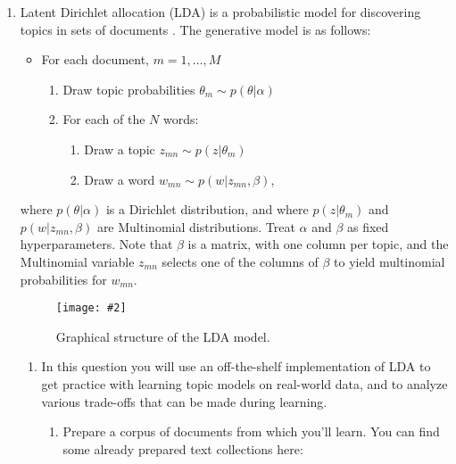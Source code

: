 \documentclass{article}
\newcommand{\widgraph}[2]{\texttt{[image: \#2]}}
\begin{document}
\begin{enumerate}
\item 
Latent Dirichlet allocation (LDA) is a probabilistic model for discovering topics in
sets of documents \cite{blei2003latent}.  The generative model is as follows: %
\begin{itemize}
  \itemsep 5pt
  \item For each document, $m = 1, \ldots, M$
    \begin{enumerate}
      \item Draw topic probabilities $\theta_m \sim p(\theta | \alpha)$
      \item For each of the $N$ words:
        \begin{enumerate}
        \item Draw a topic $z_{mn} \sim p(z | \theta_m)$
        \item Draw a word $w_{mn} \sim p(w | z_{mn}, \beta)$,
        \end{enumerate}
    \end{enumerate}
\end{itemize}
where $p(\theta | \alpha)$ is a Dirichlet distribution, and where $p(z |
\theta_m)$ and $p(w | z_{mn}, \beta)$ are Multinomial distributions.  Treat
$\alpha$ and $\beta$ as fixed hyperparameters.
Note that $\beta$ is a matrix, with one column per topic, and the
Multinomial variable $z_{mn}$ selects one of the columns of $\beta$ to yield
multinomial probabilities for $w_{mn}$. %


\begin{figure}[t]
\begin{center}
  \widgraph{.5\textwidth}{lda}
\caption{Graphical structure of the LDA model.}
\end{center}
\end{figure}

\begin{enumerate}

\item In this question you will use an off-the-shelf implementation of
  LDA to get practice with learning topic models on real-world data,
  and to analyze various trade-offs that can be made during
  learning. 
\begin{enumerate}
\item Prepare a corpus of documents from which you'll learn. You can
  find some already prepared text collections here:


\end{enumerate}
\end{enumerate}
\end{enumerate}
\end{document}
